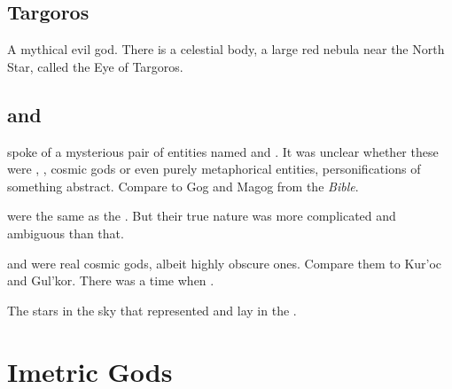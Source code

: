 \section{Targoros}
A mythical evil god. 
There is a celestial body, a large red nebula near the North Star, called the Eye of Targoros. 















\section{\Zaz and \Urzaz}
\index{\Zaz}
\index{\Urzaz}
\WanderersInDarknessEmph spoke of a mysterious pair of entities named \Zaz and \Urzaz. 
It was unclear whether these were \dragons, \xss, cosmic gods or even purely metaphorical entities, personifications of something abstract.
Compare to Gog and Magog from the \emph{Bible}.

 were the same as the . 
But their true nature was more complicated and ambiguous than that. 

\Zaz and \Urzaz were real cosmic gods, albeit highly obscure ones. 
Compare them to Kur'oc and Gul'kor.
There was a time when . 

The stars in the sky that represented \Zaz and \Urzaz lay in the .






































\chapter{Imetric Gods}















